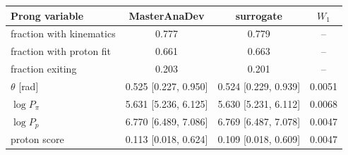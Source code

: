 \begin{tabular}{lccc}
\toprule
Prong variable & MasterAnaDev & surrogate & $W_1$ \\
\midrule
fraction with kinematics & 0.777 & 0.779 & -- \\
fraction with proton fit & 0.661 & 0.663 & -- \\
fraction exiting & 0.203 & 0.201 & -- \\
$\theta$ [rad] & 0.525 [0.227, 0.950] & 0.524 [0.229, 0.939] & 0.0051 \\
$\log P_\pi$ & 5.631 [5.236, 6.125] & 5.630 [5.231, 6.112] & 0.0068 \\
$\log P_p$ & 6.770 [6.489, 7.086] & 6.769 [6.487, 7.078] & 0.0047 \\
proton score & 0.113 [0.018, 0.624] & 0.109 [0.018, 0.609] & 0.0047 \\
\bottomrule
\end{tabular}
